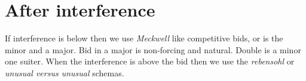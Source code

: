 \section{After interference}
If interference is below \bid{2\DS} then we use \emph{Meckwell} like competitive bids, \bid{2\CS} or \bid{2\DS} is the minor and a major. Bid in a major is non-forcing and natural. Double is a minor one suiter. When the interference is above the \bid{2\DS} bid then we use the \emph{rebensohl} or \emph{unusual versus unusual} schemas.
